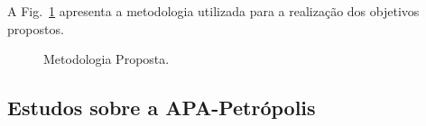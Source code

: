 \documentclass[%
  10pt,%
  aspectratio = 169,%
  compress,%
  t,%
  english,%
  brazilian,%
  tikz,
]{beamer}
\begin{document}
\begin{frame}
A Fig.~\ref{fig:metodologia} apresenta a metodologia utilizada para a realização dos objetivos propostos.
\begin{figure}[!htb]
\centering%
\caption{Metodologia Proposta.}%
\label{fig:metodologia}
\end{figure}
\end{frame}

\subsection{Estudos sobre a APA-Petrópolis}\label{ssec:matmet2}
\end{document}
